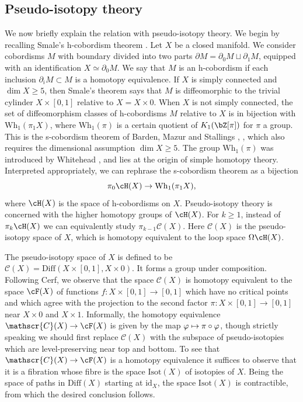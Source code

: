 \documentclass[JEP,XML,SOM,Unicode,NoFloatCountersInSection]{cedram}
\let\mathcal\mathscr
\newcommand\mto{\mathchoice{\longmapsto}{\mapsto}{\mapsto}{\mapsto}}
\newcommand{\Diff}{\mathrm{Diff}}
\newcommand{\id}{\mathrm{id}}
\newcommand{\Isot}{\mathrm{Isot}}
\newcommand{\Wh}{\mathrm{Wh}}
\theoremstyle{plain}
\theoremstyle{definition}
\newcommand{\cC}{\mathcal{C}}\newcommand{\cD}{\mathcal{D}}
\begin{document}
\subsection{Pseudo-isotopy theory}

We now briefly explain the relation with pseudo-isotopy theory. We begin by recalling Smale's h-cobordism theorem \cite{S61}. Let $X$ be a closed manifold. We consider cobordisms $M$ with boundary divided into two parts $\partial M = \partial_0M \sqcup \partial_1M$, equipped with an identification $X \simeq \partial_0 M$. We say that $M$ is an h-cobordism if each inclusion $\partial_i M \subset M$ is a homotopy equivalence. If $X$ is simply connected and $\dim X \geq 5$, then Smale's theorem says that $M$ is diffeomorphic to the trivial cylinder $X \times [0,1]$ relative to $X=X \times 0 $. When $X$ is not simply connected, the set of diffeomorphism classes of h-cobordisms $M$ relative to $X$ is in bijection with $\Wh_1( \pi_1 X)$, where $\Wh_1(\pi)$ is a certain quotient of $K_1(\bZ[\pi])$ for $\pi$ a group. This is the s-cobordism theorem of Barden, Mazur and Stallings \cite{B64}, \cite{M63}, which also requires the dimensional assumption $\dim X \geq 5$. The group $\Wh_1(\pi)$ was introduced by Whitehead \cite{W50}, and lies at the origin of simple homotopy theory. Interpreted appropriately, we can rephrase the s-cobordism theorem as a bijection\vspace*{-3pt}
\[ \pi_0 \cH(X) \to \Wh_1( \pi_1 X), \]
where $\cH(X)$ is the space of h-cobordisms on $X$. Pseudo-isotopy theory is concerned with the higher homotopy groups of $\cH(X)$. For $k \geq 1$, instead of $\pi_k\cH(X)$ we can equivalently study $\pi_{k-1}\cC(X)$. Here $\cC(X)$ is the pseudo-isotopy space of $X$, which is homotopy equivalent to the loop space $\Omega \cH(X)$.

The pseudo-isotopy space of $X$ is defined to be $\cC(X)=\Diff(X \times [0,1], X \times 0)$. It forms a group under composition. Following Cerf, we observe that the space $\cC(X)$ is homotopy equivalent to the space $\cF(X)$ of functions $f: X \times [0,1] \to [0,1]$ which have no critical points and which agree with the projection to the second factor $\pi:X \times [0,1] \to [0,1]$ near $X \times 0$ and $X \times 1$. Informally, the homotopy equivalence $\cC(X) \to \cF(X)$ is given by the map $\varphi \mto \pi \circ \varphi$, though strictly speaking we should first replace $\cC(X)$ with the subspace of pseudo-isotopies which are level-preserving near top and bottom. To see that $\cC(X) \to \cF(X)$ is a homotopy equivalence it suffices to observe that it is a fibration whose fibre is the space $\Isot(X)$ of isotopies of $X$. Being the space of paths in $\Diff(X)$ starting at $\id_X$, the space $\Isot(X)$ is contractible, from which the desired conclusion follows.
\end{document}
